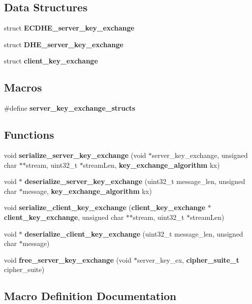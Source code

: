 \subsection*{Data Structures}
\begin{DoxyCompactItemize}
\item 
struct {\bf E\+C\+D\+H\+E\+\_\+server\+\_\+key\+\_\+exchange}
\item 
struct {\bf D\+H\+E\+\_\+server\+\_\+key\+\_\+exchange}
\item 
struct {\bf client\+\_\+key\+\_\+exchange}
\end{DoxyCompactItemize}
\subsection*{Macros}
\begin{DoxyCompactItemize}
\item 
\#define {\bf server\+\_\+key\+\_\+exchange\+\_\+structs}
\end{DoxyCompactItemize}
\subsection*{Functions}
\begin{DoxyCompactItemize}
\item 
void {\bf serialize\+\_\+server\+\_\+key\+\_\+exchange} (void $\ast$server\+\_\+key\+\_\+exchange, unsigned char $\ast$$\ast$stream, uint32\+\_\+t $\ast$stream\+Len, {\bf key\+\_\+exchange\+\_\+algorithm} kx)
\item 
void $\ast$ {\bf deserialize\+\_\+server\+\_\+key\+\_\+exchange} (uint32\+\_\+t message\+\_\+len, unsigned char $\ast$message, {\bf key\+\_\+exchange\+\_\+algorithm} kx)
\item 
void {\bf serialize\+\_\+client\+\_\+key\+\_\+exchange} ({\bf client\+\_\+key\+\_\+exchange} $\ast${\bf client\+\_\+key\+\_\+exchange}, unsigned char $\ast$$\ast$stream, uint32\+\_\+t $\ast$stream\+Len)
\item 
void $\ast$ {\bf deserialize\+\_\+client\+\_\+key\+\_\+exchange} (uint32\+\_\+t message\+\_\+len, unsigned char $\ast$message)
\item 
void {\bf free\+\_\+server\+\_\+key\+\_\+exchange} (void $\ast$server\+\_\+key\+\_\+ex, {\bf cipher\+\_\+suite\+\_\+t} cipher\+\_\+suite)
\end{DoxyCompactItemize}


\subsection{Macro Definition Documentation}
